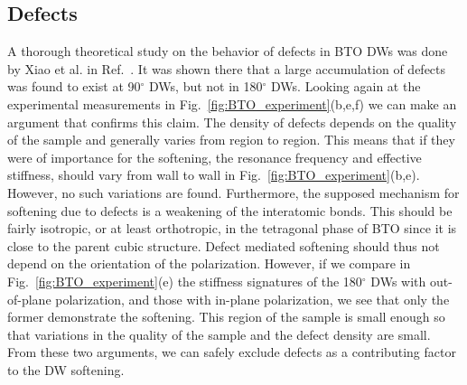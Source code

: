 \subsection{Defects}
A thorough theoretical study on the behavior of defects in BTO DWs was done by Xiao et al. in Ref.~\cite{Xiao2005}.
It was shown there that a large accumulation of defects was found to exist at 90$^\circ$ DWs, but not in 180$^\circ$ DWs.
Looking again at the experimental measurements in Fig.~\ref{fig:BTO_experiment}(b,e,f) we can make an argument that confirms this claim.
The density of defects depends on the quality of the sample and generally varies from region to region.
This means that if they were of importance for the softening, the resonance frequency and effective stiffness, should vary from wall to wall in Fig.~\ref{fig:BTO_experiment}(b,e).
However, no such variations are found.
Furthermore, the supposed mechanism for softening due to defects is a weakening of the interatomic bonds.
This should be fairly isotropic, or at least orthotropic, in the tetragonal phase of BTO since it is close to the parent cubic structure.
Defect mediated softening should thus not depend on the orientation of the polarization.
However, if we compare in Fig.~\ref{fig:BTO_experiment}(e) the stiffness signatures of the 180$^\circ$ DWs with out-of-plane polarization, and those with in-plane polarization, we see that only the former demonstrate the softening.
This region of the sample is small enough so that variations in the quality of the sample and the defect density are small.
From these two arguments, we can safely exclude defects as a contributing factor to the DW softening.
